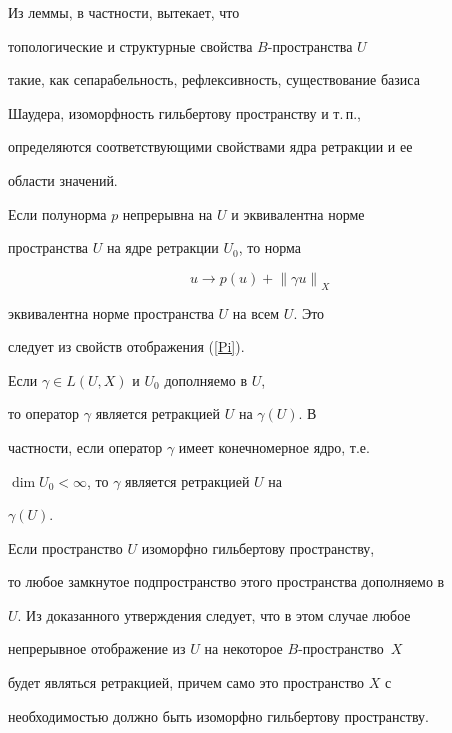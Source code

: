 \begin{note}


Из леммы, в частности, вытекает, что


топологические и структурные свойства $B$-пространства $U$


такие, как сепарабельность, рефлексивность, существование базиса


Шаудера, изоморфность гильбертову пространству и т.\,п.,


определяются соответствующими свойствами ядра ретракции и ее


области значений.


\end{note}





\begin{note}


Если полунорма $p$ непрерывна на $U$ и эквивалентна норме


пространства $U$ на ядре ретракции $U_0$, то норма


$$


u \rightarrow p(u)+{\|\gamma u \|}_X


$$


эквивалентна норме пространства $U$ на всем $U$. Это


следует из свойств отображения (\ref{Pi}).


\end{note}





\begin{note}


Если $\gamma \in L(U,X)$ и $U_0$ дополняемо в $U$,


то оператор $\gamma$ является ретракцией $U$ на $\gamma(U)$. В


частности, если оператор $\gamma$ имеет конечномерное ядро, т.е.


$\dim U_0 < \infty$, то $\gamma$ является ретракцией $U$ на


$\gamma(U)$.


\end{note}





\begin{note}


Если пространство $U$ изоморфно гильбертову пространству,


то любое замкнутое подпространство этого пространства дополняемо в


$U$. Из доказанного утверждения следует, что в этом случае любое


непрерывное отображение из $U$ на некоторое $B$-прост\-ран\-ст\-во~$X$


будет являться ретракцией, причем само это пространство $X$ с


необходимостью должно быть изоморфно гильбертову пространству.


\end{note}





